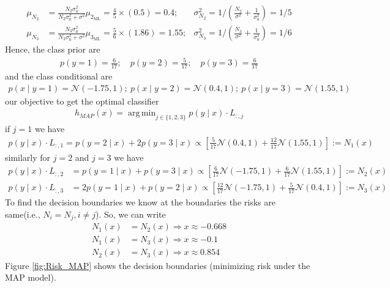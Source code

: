\documentclass[solution,addpoints,12pt]{exam}
\DeclareMathOperator*{\argmin}{arg\,min}
\begin{document}
\begin{questions}
\begin{parts}
\begin{subparts}
\begin{solution}
\begin{align*}
		\mu_{N_2}&=\frac{N_2\sigma_{0}^2}{N_2\sigma_{0}^2+\sigma^2}\mu_{2_{\text{ML}}}=\frac{4}{5}\times (0.5)=0.4;&\sigma_{N_2}^2 = 1/\left(\frac{N_2}{\sigma^2}+\frac{1}{\sigma_{0}^2}\right)=1/5\\
		\mu_{N_3}&=\frac{N_3\sigma_{0}^2}{N_3\sigma_{0}^2+\sigma^2}\mu_{3_{\text{ML}}}=\frac{5}{6}\times (1.86)=1.55;&\sigma_{N_3}^2 = 1/\left(\frac{N_3}{\sigma^2}+\frac{1}{\sigma_{0}^2}\right)=1/6
	\end{align*}
	Hence, the class prior are 
	\begin{align*}
		p(y=1)=\frac{6}{17};\quad
		p(y=2)=\frac{5}{17};\quad
		p(y=3)=\frac{6}{17}	
	\end{align*}
	and the class conditional are
	\begin{align*}
		p(x\mid y=1)=\mathcal{N}\left(-1.75,1\right);~
		p(x\mid y=2)=\mathcal{N}\left(0.4,1\right);~
		p(x\mid y=3)=\mathcal{N}\left(1.55,1\right)
	\end{align*}
	our objective to get the optimal classifier
	\begin{align*}
		h_{MAP}(x) = \argmin_{j\in\{1,2,3\}} p(y\mid x)\cdot L_{:,j}
	\end{align*} 
	if $j=1$ we have
	\begin{align*}
		p(y\mid x)\cdot L_{:,1} =p(y=2\mid x)+2p(y=3\mid x)\propto\left[\frac{5}{17}\mathcal{N}\left(0.4,1\right)+\frac{12}{17}\mathcal{N}\left(1.55,1\right)\right]:=N_1(x)
	\end{align*}
	similarly for $j=2 $ and $j=3$ we have
	\begin{align*}
		p(y\mid x)\cdot L_{:,2}& =p(y=1\mid x)+p(y=3\mid x)\propto\left[\frac{6}{17}\mathcal{N}\left(-1.75,1\right)+\frac{6}{17}\mathcal{N}\left(1.55,1\right)\right]:=N_2(x)\\
		p(y\mid x)\cdot L_{:,3}& =2p(y=1\mid x)+p(y=2\mid x)\propto\left[\frac{12}{17}\mathcal{N}\left(-1.75,1\right)+\frac{5}{17}\mathcal{N}\left(0.4,1\right)\right]:=N_3(x)
	\end{align*}
	To find the decision boundaries we know at the boundaries the risks are same(i.e., $N_i=N_j,i\neq j $). So, we can write
	\begin{align*}
		N_1(x)&=N_2(x)\Rightarrow x\approx -0.668\\
		N_1(x)&=N_3(x)\Rightarrow x\approx -0.1\\
		N_2(x)&=N_3(x)\Rightarrow x\approx 0.854
	\end{align*}
	Figure \ref{fig:Risk_MAP} shows the decision boundaries (minimizing risk under the MAP model).
	\begin{figure}[H]

\end{figure}
\end{solution}
\end{subparts}
\end{parts}
\end{questions}
\end{document}
